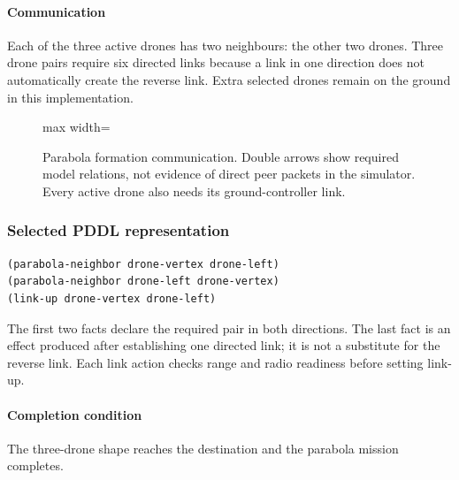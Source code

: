 \documentclass[11pt,a4paper,oneside]{report}
\begin{document}
\paragraph{Communication}
Each of the three active drones has two neighbours: the other two drones. Three drone pairs require six directed links because a link in one direction does not automatically create the reverse link. Extra selected drones remain on the ground in this implementation.

\begin{figure}[H]
\centering
\begin{adjustbox}{max width=\linewidth}
\end{adjustbox}
\caption[Parabola formation communication]{Parabola formation communication. Double arrows show required model
relations, not evidence of direct peer packets in the simulator. Every active drone
also needs its ground-controller link.}
\label{fig:comm-parabola}
\end{figure}
\subsubsection*{Selected PDDL representation}
\begin{lstlisting}
(parabola-neighbor drone-vertex drone-left)
(parabola-neighbor drone-left drone-vertex)
(link-up drone-vertex drone-left)
\end{lstlisting}
The first two facts declare the required pair in both directions. The last fact is an effect produced after establishing one directed link; it is not a substitute for the reverse link. Each link action checks range and radio readiness before setting link-up.

\paragraph{Completion condition}
The three-drone shape reaches the destination and the parabola mission completes.
\end{document}
